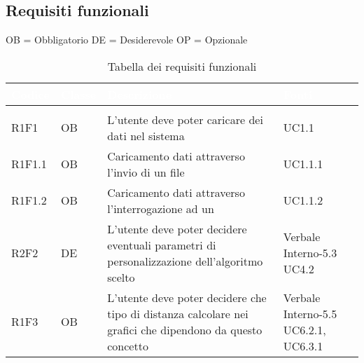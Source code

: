 \subsection{Requisiti funzionali}
OB = Obbligatorio \quad DE = Desiderevole \quad OP = Opzionale
\renewcommand{\arraystretch}{1.5}
{
\setlength\arrayrulewidth{1pt}
\begin{longtable}{C{2cm} | C{1.5cm} | C{9cm} | C{3.3cm}}
		\textcolor{white}{\textbf{Codice}} & 
		\textcolor{white}{\textbf{Classe}} & 
		\textcolor{white}{\textbf{Descrizione}} & 
		\textcolor{white}{\textbf{Fonti}} \\
		\endfirsthead
	    \\
	    \endfoot
	    \caption{Tabella dei requisiti funzionali}
	    \endlastfoot

R1F1 & OB & L'utente deve poter caricare dei dati nel sistema & UC1.1\\
R1F1.1 & OB & Caricamento dati attraverso l'invio di un file  & UC1.1.1\\
R1F1.2 & OB & Caricamento dati attraverso l'interrogazione ad un  & UC1.1.2\\

R2F2 & DE & L'utente deve poter decidere eventuali parametri di personalizzazione dell'algoritmo scelto & Verbale Interno-5.3 \newline UC4.2\\

R1F3 & OB & L'utente deve poter decidere che tipo di distanza calcolare nei grafici che dipendono da questo concetto & Verbale Interno-5.5 \newline UC6.2.1, UC6.3.1\\


\end{longtable}}
